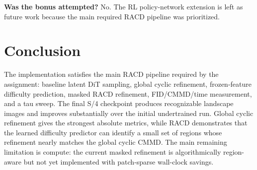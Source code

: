\documentclass{article}
\begin{document}
\textbf{Was the bonus attempted?} No. The RL policy-network extension is left
as future work because the main required RACD pipeline was prioritized.

\section{Conclusion}

The implementation satisfies the main RACD pipeline required by the assignment:
baseline latent DiT sampling, global cyclic refinement, frozen-feature difficulty
prediction, masked RACD refinement, FID/CMMD/time measurement, and a tau sweep.
The final S/4 checkpoint produces recognizable landscape images and improves
substantially over the initial undertrained run. Global cyclic refinement gives
the strongest absolute metrics, while RACD demonstrates that the learned
difficulty predictor can identify a small set of regions whose refinement
nearly matches the global cyclic CMMD. The main remaining limitation is compute:
the current masked refinement is algorithmically region-aware but not yet
implemented with patch-sparse wall-clock savings.
\end{document}
